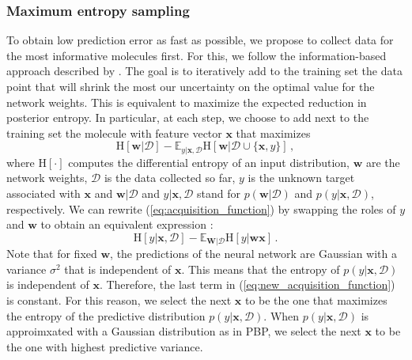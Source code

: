 \subsubsection{Maximum entropy sampling}

To obtain low prediction error as fast as possible, we propose to collect data for the most informative molecules first. For this, we follow the information-based approach described by \cite{MacKay_1992}. The goal is to iteratively add to the training set the data point that will shrink the most our uncertainty on the optimal value for the network weights. This is equivalent to maximize the expected reduction in posterior entropy. In particular, at each step, we choose to add next to the training set the molecule with feature vector $\mathbf{x}$ that maximizes
\begin{equation}
\text{H}[\mathbf{w}|\mathcal{D}]  - 
\mathbb{E}_{y|\mathbf{x},\mathcal{D}}\text{H}[\mathbf{w}|\mathcal{D}\cup\{\mathbf{x},y\}]\,,\label{eq:acquisition_function}
\end{equation}
where $\text{H}[\cdot]$ computes the differential entropy of an input distribution, $\mathbf{w}$ are the network weights, $\mathcal{D}$ is the data collected so far, $y$ is the unknown target associated with $\mathbf{x}$ and $\mathbf{w}|\mathcal{D}$ and $y|\mathbf{x},\mathcal{D}$ stand for $p(\mathbf{w}|\mathcal{D})$ and $p(y|\mathbf{x},\mathcal{D})$, respectively. We can rewrite (\ref{eq:acquisition_function}) by swapping the roles of $y$ and $\mathbf{w}$ to obtain an equivalent expression \cite{houlsby2012collaborative}:
\begin{equation}
\text{H}[y | \mathbf{x},\mathcal{D}] - 
\mathbb{E}_{\mathbf{W} | \mathcal{D}}\text{H}[y | \mathbf{w}\mathbf{x}]\,.\label{eq:new_acquisition_function}
\end{equation}
Note that for fixed $\mathbf{w}$, the predictions of the neural network are Gaussian with a variance $\sigma^2$ that is independent of $\mathbf{x}$. This means that the entropy of $p(y| \mathbf{x},\mathcal{D})$ is independent of $\mathbf{x}$.
Therefore, the last term in (\ref{eq:new_acquisition_function}) is constant.
For this reason, we select the next $\mathbf{x}$ to be the one that maximizes the entropy of the predictive distribution $p(y| \mathbf{x},\mathcal{D})$. When $p(y| \mathbf{x},\mathcal{D})$ is approimxated with a Gaussian distribution as in PBP, we select the next $\mathbf{x}$ to be the one with highest predictive variance.